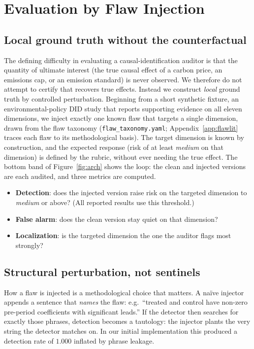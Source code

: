 \section{Evaluation by Flaw Injection}
\label{sec:evaluation}

\subsection{Local ground truth without the counterfactual}
The defining difficulty in evaluating a causal-identification auditor is that the
quantity of ultimate interest (the true causal effect of a carbon price, an
emissions cap, or an emission standard) is never observed. We therefore do not
attempt to certify that \sys{} recovers true effects. Instead we construct
\emph{local} ground truth by controlled perturbation. Beginning from a short
synthetic fixture, an environmental-policy DID study that reports supporting
evidence on all eleven dimensions, we inject
exactly one known flaw that targets a single dimension, drawn from the flaw
taxonomy (\texttt{flaw\_taxonomy.yaml}; Appendix~\ref{app:flawlit} traces
each flaw to its methodological basis). The target dimension is known by
construction, and the expected response (risk of at least \emph{medium} on
that dimension) is defined by the rubric, without ever needing the true
effect. The bottom band of Figure~\ref{fig:arch} shows the loop: the clean and
injected versions are each audited, and three metrics are computed.

\begin{itemize}
  \item \textbf{Detection}: does the injected version raise risk on the targeted
        dimension to \emph{medium} or above? (All reported results use this
        threshold.)
  \item \textbf{False alarm}: does the clean version stay quiet on that dimension?
  \item \textbf{Localization}: is the targeted dimension the one the auditor flags
        most strongly?
\end{itemize}

\subsection{Structural perturbation, not sentinels}
How a flaw is injected is a methodological choice that matters. A na\"ive injector
appends a sentence that \emph{names} the flaw: e.g.\ ``treated and control have
non-zero pre-period coefficients with significant leads.'' If the detector then
searches for exactly those phrases, detection becomes a tautology: the injector
plants the very string the detector matches on. In our initial implementation this
produced a detection rate of $1.000$ inflated by phrase leakage.

